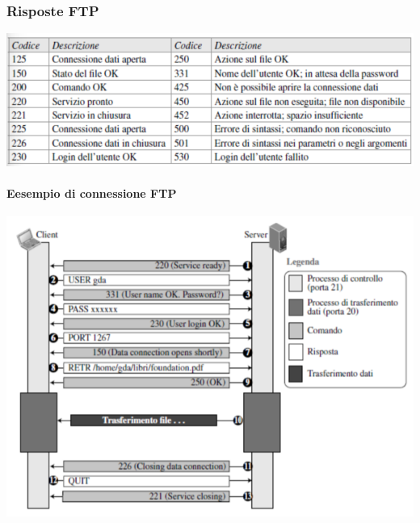 \documentclass[12pt]{report}
\begin{document}
	\subsubsection{Risposte FTP}
	\begin{center}
		\includegraphics[scale=0.6]{assets/ftp-res.png}
	\end{center}

	\paragraph{Eesempio di connessione FTP}
	\begin{center}
		\includegraphics[scale=0.5]{assets/ftp-ex.png}
	\end{center}
\end{document}
